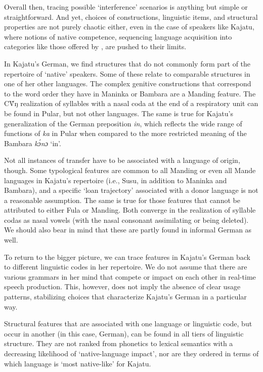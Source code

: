 \documentclass[output=paper]{langscibook}
\begin{document}
Overall then, tracing possible ‘interference’ scenarios is anything but simple or straightforward. And yet, choices of constructions, linguistic items, and structural properties are not purely chaotic either, even in the case of speakers like Kajatu, where notions of native competence, sequencing language acquisition into categories like those offered by \citet{klein_second_1986}, are pushed to their limits. 

In Kajatu’s German, we find structures that do not commonly form part of the repertoire of ‘native’ speakers. Some of these relate to comparable structures in one of her other languages. The complex genitive constructions that correspond to the word order they have in Maninka or Bambara are a Manding feature. The CṼŋ realization of syllables with a nasal coda at the end of a respiratory unit can be found in Pular, but not other languages. The same is true for Kajatu’s generalization of the German preposition \textit{in}, which reflects the wide range of functions of \textit{ka} in Pular when compared to the more restricted meaning of the Bambara \textit{kɔ́nɔ} ‘in’. 


Not all instances of transfer have to be associated with a language of origin, though. Some typological features are common to all Manding or even all Mande languages in Kajatu’s repertoire (i.e., Susu, in addition to Maninka and Bambara), and a specific ‘loan trajectory’ associated with a donor language is not a reasonable assumption. The same is true for those features that cannot be attributed to either Fula or Manding. Both converge in the realization of syllable codas as nasal vowels (with the nasal consonant assimilating or being deleted). We should also bear in mind that these are partly found in informal German as well. 

To return to the bigger picture, we can trace features in Kajatu’s German back to different linguistic codes in her repertoire. We do not assume that there are various grammars in her mind that compete or impact on each other in real-time speech production. This, however, does not imply the absence of clear usage patterns, stabilizing choices that characterize Kajatu’s German in a particular way. 

Structural features that are associated with one language or linguistic code, but occur in another (in this case, German), can be found in all tiers of linguistic structure. They are not ranked from phonetics to lexical semantics with a decreasing likelihood of ‘native-language impact’, nor are they ordered in terms of which language is ‘most native-like’ for Kajatu.
\end{document}
